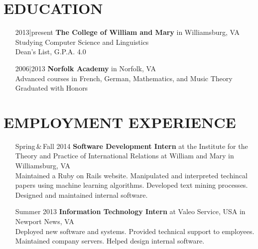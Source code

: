 \documentclass{res}     %
\begin{document}
\begin{resume}

\section{EDUCATION}          
\vspace{5mm}
\begin{itemize}[font=\itshape,align=parleft,labelwidth=3cm,leftmargin=2cm]
    \item[2013|present]
        \textbf{The College of William and Mary} in Williamsburg, VA
        \\ Studying Computer Science and Linguistics
        \\ Dean's List, G.P.A. 4.0
    \item[2006|2013]
        \textbf{Norfolk Academy} in Norfolk, VA
        \\ Advanced courses in French, German, Mathematics, and Music Theory
        \\ Graduated with Honors
\end{itemize}

\section{EMPLOYMENT EXPERIENCE}
\vspace{5mm}
\begin{itemize}[font=\itshape,align=parleft,labelwidth=3cm,leftmargin=2cm]
    \item[Spring\,\&\,Fall 2014]
        \textbf{Software Development Intern}
        at the Institute for the Theory and Practice of International Relations
        at William and Mary
        in Williamsburg, VA
        \vspace{1mm} \\
        Maintained a Ruby on Rails website.
        Manipulated and interpreted techincal papers using machine learning algorithms.
        Developed text mining processes.
        Designed and maintained internal software.
    \item[Summer 2013]
        \textbf{Information Technology Intern}
        at Valeo Service, USA
        in Newport News, VA
        \vspace{1mm} \\
        Deployed new software and systems.
        Provided technical support to employees.
        Maintained company servers.
        Helped design internal software.
\end{itemize}


\end{resume}
\end{document}
